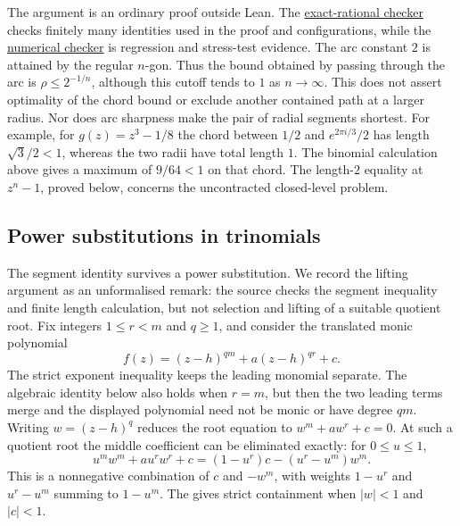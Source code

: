 \documentclass[11pt]{article}
\begin{document}
The argument is an ordinary proof outside Lean.  The
\href{https://github.com/wcook04/plectis-erdos/blob/f214a6b45528dc5eefe20ffadc35f2e981627d4c/research_corpus/Erdos1041/scripts/check_erdos1041_concyclic_exact_witness.py}{exact-rational checker}
checks finitely many identities used in the proof and configurations, while the
\href{https://github.com/wcook04/plectis-erdos/blob/f214a6b45528dc5eefe20ffadc35f2e981627d4c/research_corpus/Erdos1041/scripts/check_erdos1041_concyclic_alternation.py}{numerical checker}
is regression and stress-test evidence. The arc constant $2$ is attained
by the regular $n$-gon. Thus the bound obtained by passing through the
arc is $\rho\le2^{-1/n}$, although this cutoff tends to $1$ as
$n\to\infty$. This does not assert optimality of the chord bound or
exclude another contained path at a larger radius. Nor does arc
sharpness make the pair of radial segments shortest. For example, for
$g(z)=z^3-1/8$ the chord between $1/2$ and $e^{2\pi i/3}/2$ has length
$\sqrt3/2<1$, whereas the two radii have total length $1$. The binomial
calculation above gives a maximum of $9/64<1$ on that chord. The
length-$2$ equality at $z^n-1$, proved below, concerns the uncontracted
closed-level problem.

\subsection*{Power substitutions in trinomials}

The segment identity survives a power substitution. We record the
lifting argument as an unformalised remark: the source checks the
segment inequality and finite length calculation, but not selection
and lifting of a suitable quotient root. Fix
integers $1\le r<m$ and $q\ge1$, and consider the translated monic polynomial
\[
 f(z)=(z-h)^{qm}+a(z-h)^{qr}+c.
\]
The strict exponent inequality keeps the leading monomial separate.
The algebraic identity below also holds when $r=m$, but then the two
leading terms merge and the displayed polynomial need not be monic or
have degree $qm$.
Writing $w=(z-h)^q$ reduces the root equation to
$w^m+aw^r+c=0$.  At such a quotient root the middle coefficient can be
eliminated exactly: for $0\le u\le1$,
\[
 u^mw^m+au^rw^r+c
   =(1-u^r)c-(u^r-u^m)w^m.
\]
This is a nonnegative combination of $c$ and $-w^m$, with weights
$1-u^r$ and $u^r-u^m$ summing to $1-u^m$. The
gives strict containment when $|w|<1$ and $|c|<1$.
\end{document}
